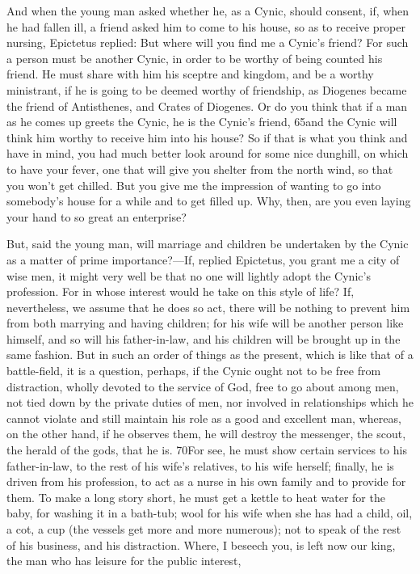 And when the young man asked whether he, as a Cynic, should consent, if, when he had fallen ill, a friend asked him to come to his house, so as to receive proper nursing, Epictetus replied: But where will you find me a Cynic's friend? For such a person must be another Cynic, in order to be worthy of being counted his friend. He must share with him his sceptre and kingdom, and be a worthy ministrant, if he is going to be deemed worthy of friendship, as Diogenes became the friend of Antisthenes, and Crates of Diogenes. Or do you think that if a man as he comes up greets the Cynic, he is the Cynic's friend, 65and the Cynic will think him worthy to receive him into his house? So if that is what you think and have in mind, you had much better look around for some nice dunghill, on which to have your fever, one that will give you shelter from the north wind, so that you won't get chilled. But you give me the impression of wanting to go into somebody's house for a while and to get filled up. Why, then, are you even laying your hand to so great an enterprise?

But, said the young man, will marriage and children be undertaken by the Cynic as a matter of prime importance?—If, replied Epictetus, you grant me a city of wise men, it might very well be that no one will lightly adopt the Cynic's profession. For in whose interest would he take on this style of life? If, nevertheless, we assume that he does so act, there will be nothing to prevent him from both marrying and having children; for his wife will be another person like himself, and so will his father-in-law, and his children will be brought up in the same fashion. But in such an order of things as the present, which is like that of a battle-field, it is a question, perhaps, if the Cynic ought not to be free from distraction, wholly devoted to the service of God, free to go about among men, not tied down by the private duties of men, nor involved in relationships which he cannot violate and still maintain his role as a good and excellent man, whereas, on the other hand, if he observes them, he will destroy the messenger, the scout, the herald of the gods, that he is. 70For see, he must show certain services to his father-in-law, to the rest of his wife's relatives, to his wife herself; finally, he is driven from his profession, to act as a nurse in his own family and to provide for them. To make a long story short, he must get a kettle to heat water for the baby, for washing it in a bath-tub; wool for his wife when she has had a child, oil, a cot, a cup (the vessels get more and more numerous); not to speak of the rest of his business, and his distraction. Where, I beseech you, is left now our king, the man who has leisure for the public interest,

